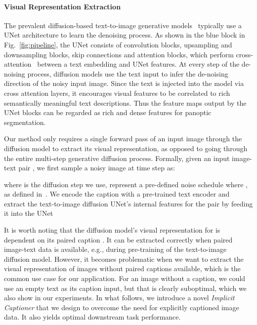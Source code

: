 \documentclass[10pt,twocolumn,letterpaper]{article}
\begin{document}
\paragraph{Visual Representation Extraction}
The prevalent diffusion-based text-to-image generative models~\cite{ramesh2022dalle2,saharia2022imagen,rombach2022ldm, nichol2021glide} typically use a UNet architecture to learn the denoising process. As shown in the blue block in Fig.~\ref{fig:pipeline}, the UNet consists of convolution blocks, upsampling and downsampling blocks, skip connections and attention blocks, which perform cross-attention~\cite{vaswani2017attention} between a text embedding and UNet features.
At every step of the de-noising process, diffusion models use the text input to infer the de-noising direction of the noisy input image. 
Since the text is injected into the model via cross attention layers, it encourages visual features to be correlated to rich semantically meaningful text descriptions. 
Thus the feature maps output by the UNet blocks can be regarded as rich and dense features for panoptic segmentation. 

Our method only requires a single forward pass of an input image through the diffusion model to extract its visual representation, as opposed to going through the entire multi-step generative diffusion process.  
Formally, given an input image-text pair , 
we first sample a noisy image  at time step  as:

where  is the diffusion step we use,  represent a pre-defined noise schedule where , as defined in~\cite{ho2020denoising}.
We encode the caption  with a pre-trained text encoder  and extract the text-to-image diffusion UNet's internal features  for the pair by feeding it into the UNet


It is worth noting that the diffusion model's visual representation  for  is dependent on its paired caption . 
It can be extracted correctly when paired image-text data is available, e.g., during pre-training of the text-to-image diffusion model. 
However, it becomes problematic when we want to extract the visual representation of images without paired captions available, which is the common use case for our application. 
For an image without a caption, we could use an empty text as its caption input, but that is clearly suboptimal, which we also show in our experiments. 
In what follows, we introduce a novel \emph{Implicit Captioner} that we design to overcome the need for explicitly captioned image data. It also yields optimal downstream task performance.
\end{document}
